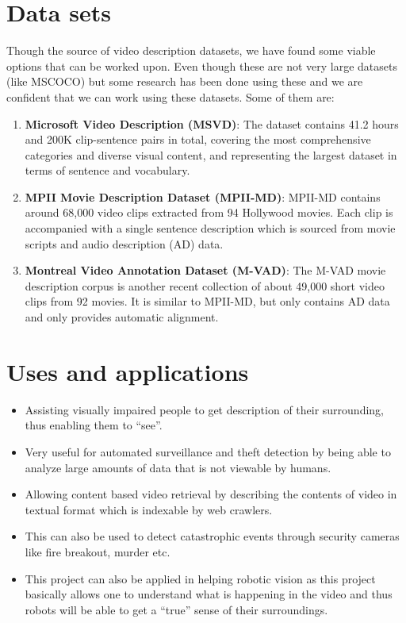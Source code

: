\documentclass{article}
\begin{document}
	\section{Data sets}
		Though the source of video description datasets, we have found some viable options that can be worked upon. Even though these are not very large datasets (like MSCOCO) but some research has been done using these and we are confident that we can work using these datasets. Some of them are:
		\begin{enumerate}
		\item
			\textbf{Microsoft Video Description (MSVD)}: The dataset contains 41.2 hours and 200K clip-sentence pairs in total, covering the most comprehensive categories and diverse visual content, and representing the largest dataset in terms of sentence and vocabulary.
		\item
			\textbf{MPII Movie Description Dataset (MPII-MD)}: MPII-MD contains around 68,000 video clips extracted from 94 Hollywood movies. Each clip is accompanied with a single sentence description which is sourced from movie scripts and audio description (AD) data.
		\item
			\textbf{Montreal Video Annotation Dataset (M-VAD)}: The M-VAD movie description corpus is another recent collection of about 49,000 short video clips from 92 movies. It is similar to MPII-MD, but only contains AD data and only provides automatic alignment. 
		\end{enumerate}


	\section{Uses and applications}
			\begin{itemize}
				\item
					Assisting visually impaired people to get description of their surrounding, thus enabling them to ``see''.
				\item
					Very useful for automated surveillance and theft detection by being able to analyze large amounts of data that is not viewable by humans.
				\item
					Allowing content based video retrieval by describing the contents of video in textual format which is indexable by web crawlers.
				\item
					This can also be used to detect catastrophic events through security cameras like fire breakout, murder etc.
				\item
					This project can also be applied in helping robotic vision as this project basically allows one to understand what is happening in the video and thus robots will be able to get a ``true'' sense of their surroundings.
			\end{itemize}
\end{document}
